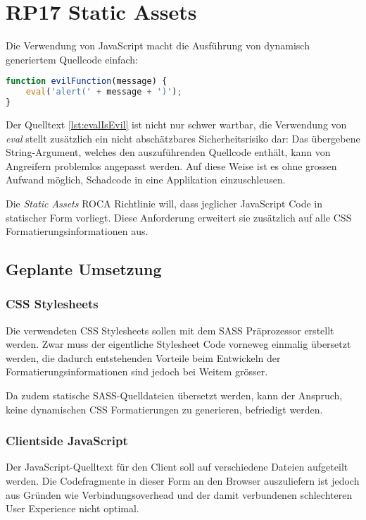 \section{RP17 Static Assets}
\label{sec:principle-rp17-static-assets}

Die Verwendung von JavaScript macht die Ausführung von dynamisch generiertem Quellcode einfach:

\begin{lstlisting}[language=JavaScript, caption={Ausführung von dynamischem Quelltext mittels \emph{eval}}, label={lst:evalIsEvil}]
function evilFunction(message) {
	eval('alert(' + message + ')');
}
\end{lstlisting}

Der Quelltext \ref{lst:evalIsEvil} ist nicht nur schwer wartbar, die Verwendung von \emph{eval} \cite{mdnEval} stellt zusätzlich ein nicht abschätzbares Sicherheitsrisiko dar: Das übergebene String-Argument, welches den auszuführenden Quellcode enthält, kann von Angreifern problemlos angepasst werden. Auf diese Weise ist es ohne grossen Aufwand möglich, Schadcode in eine Applikation einzuschleusen.

Die \emph{Static Assets} ROCA Richtlinie will, dass jeglicher JavaScript Code in statischer Form vorliegt. Diese Anforderung erweitert sie zusätzlich auf alle CSS Formatierungsinformationen aus.

\subsection*{Geplante Umsetzung}
\subsubsection*{CSS Stylesheets}
Die verwendeten CSS Stylesheets sollen mit dem SASS Präprozessor \cite{SASS} erstellt werden. Zwar muss der eigentliche Stylesheet Code vorneweg einmalig übersetzt werden, die dadurch entstehenden Vorteile beim Entwickeln der Formatierungsinformationen sind jedoch bei Weitem grösser.

Da zudem statische SASS-Quelldateien übersetzt werden, kann der Anspruch, keine dynamischen CSS Formatierungen zu generieren, befriedigt werden.

\subsubsection*{Clientside JavaScript}
Der JavaScript-Quelltext für den Client soll auf verschiedene Dateien aufgeteilt werden. Die Codefragmente in dieser Form an den Browser auszuliefern ist jedoch aus Gründen wie Verbindungsoverhead und der damit verbundenen schlechteren User Experience nicht optimal.


